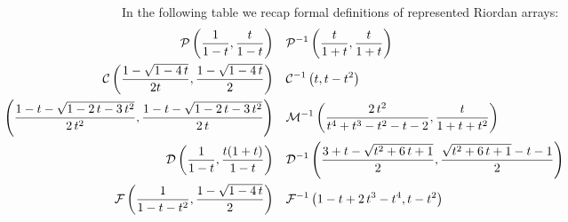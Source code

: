 In the following table we recap formal definitions of represented Riordan
arrays:
\begin{displaymath}
    \hspace{-4cm}
    \begin{split}
        \mathcal{P}\left(\frac{1}{1-t},\frac{t}{1-t}\right) &\quad
            \mathcal{P}^{-1}\left(\frac{t}{1+t}, \frac{t}{1+t}\right) \\
        \mathcal{C}\left(\frac{1-\sqrt{1-4\,t}}{2t},\frac{1-\sqrt{1-4\,t}}{2}\right) &\quad
            \mathcal{C}^{-1}\left(t,t-t^{2}\right) \\
        \mathcal{M}\left(\frac{1-t - \sqrt{1- 2 \, t -3 \, t^{2} }}{2 \, t^{2}}, 
                \frac{1-t - \sqrt{1 - 2 \, t-3 \, t^{2}}}{2 \, t}\right) &\quad
            \mathcal{M}^{-1}\left(\frac{2\,t^{2}}{t^{4}+t^{3}-t^{2}-t-2}, \frac{t}{1+t+t^{2}}\right) \\
        \mathcal{D}\left(\frac{1}{1-t},\frac{t(1+t)}{1-t}\right) &\quad
            \mathcal{D}^{-1}\left(\frac{3+t-\sqrt{t^{2} + 6 \, t + 1}}{2}, 
                \frac{\sqrt{t^{2} + 6 \, t + 1}-t-1}{2}\right) \\
        \mathcal{F}\left(\frac{1}{1-t-t^{2}}, \frac{1-\sqrt{1-4 \, t}}{2}\right) &\quad
            \mathcal{F}^{-1}\left(1-t + 2 \, t^{3} -t^{4}, t - t^{2}\right) \\
    \end{split}
\end{displaymath}









%

